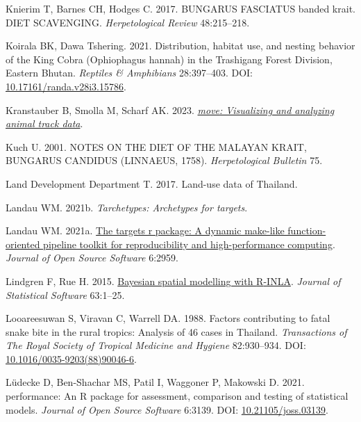 \documentclass[10pt,a4paper]{article}
\newlength{\cslhangindent}
\newenvironment{CSLReferences}[2] %
 {\begin{list}{}{%
  \setlength{\itemindent}{0pt}
  \setlength{\leftmargin}{0pt}
  \setlength{\parsep}{0pt}
  \ifodd #1
   \setlength{\leftmargin}{\cslhangindent}
   \setlength{\itemindent}{-1\cslhangindent}
  \fi
  \setlength{\itemsep}{#2\baselineskip}}}
 {\end{list}}
\begin{document}
\begin{CSLReferences}{1}{0}
Knierim T, Barnes CH, Hodges C. 2017. BUNGARUS FASCIATUS banded krait. DIET SCAVENGING. \emph{Herpetological Review} 48:215--218.

Koirala BK, Dawa Tshering. 2021. Distribution, habitat use, and nesting behavior of the {King} {Cobra} ({Ophiophagus} hannah) in the {Trashigang} {Forest} {Division}, {Eastern} {Bhutan}. \emph{Reptiles \& Amphibians} 28:397--403. DOI: \href{https://doi.org/10.17161/randa.v28i3.15786}{10.17161/randa.v28i3.15786}.

Kranstauber B, Smolla M, Scharf AK. 2023. \emph{\href{https://CRAN.R-project.org/package=move}{{move}: Visualizing and analyzing animal track data}}.

Kuch U. 2001. {NOTES} {ON} {THE} {DIET} {OF} {THE} {MALAYAN} {KRAIT}, {BUNGARUS} {CANDIDUS} ({LINNAEUS}, 1758). \emph{Herpetological Bulletin} 75.

Land Development Department T. 2017. Land-use data of {Thailand}.

Landau WM. 2021b. \emph{Tarchetypes: Archetypes for targets}.

Landau WM. 2021a. \href{https://doi.org/10.21105/joss.02959}{The targets r package: A dynamic make-like function-oriented pipeline toolkit for reproducibility and high-performance computing}. \emph{Journal of Open Source Software} 6:2959.

Lindgren F, Rue H. 2015. \href{http://www.jstatsoft.org/v63/i19/}{Bayesian spatial modelling with {R}-{INLA}}. \emph{Journal of Statistical Software} 63:1--25.

Looareesuwan S, Viravan C, Warrell DA. 1988. Factors contributing to fatal snake bite in the rural tropics: Analysis of 46 cases in {Thailand}. \emph{Transactions of The Royal Society of Tropical Medicine and Hygiene} 82:930--934. DOI: \href{https://doi.org/10.1016/0035-9203(88)90046-6}{10.1016/0035-9203(88)90046-6}.

Lüdecke D, Ben-Shachar MS, Patil I, Waggoner P, Makowski D. 2021. {performance}: An {R} package for assessment, comparison and testing of statistical models. \emph{Journal of Open Source Software} 6:3139. DOI: \href{https://doi.org/10.21105/joss.03139}{10.21105/joss.03139}.


\end{CSLReferences}
\end{document}
